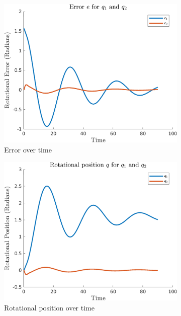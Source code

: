 \documentclass{article}
\begin{document}
\begin{figure}[H]
    \centering
    \begin{subfigure}{0.325\textwidth}
        \centering
        \includegraphics[width = \textwidth]{figures/error-b2.png}
        \caption{Error over time}
    \end{subfigure}
    \begin{subfigure}{0.325\textwidth}
        \centering
        \includegraphics[width = \textwidth]{figures/rotational-position-b2.png}
        \caption{Rotational position over time}
    \end{subfigure}
    \begin{subfigure}{0.325\textwidth}

\end{subfigure}
\end{figure}
\end{document}
